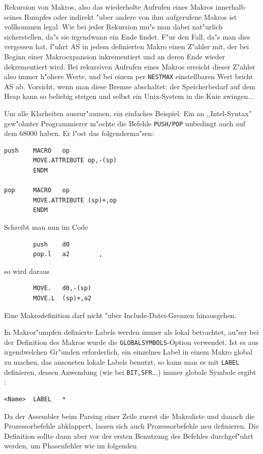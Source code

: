 \documentclass[12pt,a4paper,twoside]{report}
\newcommand{\tty}[1]{{\tt #1}}
\newcommand{\asname}{AS}
\begin{document}
Rekursion von Makros, also das wiederholte Aufrufen eines Makros innerhalb
seines Rumpfes oder indirekt "uber andere von ihm aufgerufene Makros ist
vollkommen legal.  Wie bei jeder Rekursion mu"s man dabei nat"urlich
sicherstellen, da"s sie irgendwann ein Ende findet.  F"ur den Fall, da"s
man dies vergessen hat, f"uhrt \asname{} in jedem definierten Makro einen Z"ahler
mit, der bei Beginn einer Makroexpansion inkrementiert und an deren Ende
wieder dekrementiert wird.  Bei rekursiven Aufrufen eines Makros erreicht
dieser Z"ahler also immer h"ohere Werte, und bei einem per {\tt NESTMAX}
einstellbaren Wert bricht \asname{} ab.  Vorsicht, wenn man diese Bremse
abschaltet: der Speicherbedarf auf dem Heap kann so beliebig steigen und
selbst ein Unix-System in die Knie zwingen...
\par
Um alle Klarheiten auszur"aumen, ein einfaches Beispiel:
Ein an ,,Intel-Syntax'' gew"ohnter Programmierer m"ochte die Befehle \tty{PUSH/POP}
unbedingt auch auf dem 68000 haben.  Er l"ost das
folgenderma"sen:
\begin{verbatim}
push    MACRO   op
        MOVE.ATTRIBUTE op,-(sp)
        ENDM

pop     MACRO   op
        MOVE.ATTRIBUTE (sp)+,op
        ENDM
\end{verbatim}
Schreibt man nun im Code
\begin{verbatim}
        push    d0
        pop.l   a2        ,
\end{verbatim}
so wird daraus
\begin{verbatim}
        MOVE.   d0,-(sp)
        MOVE.L  (sp)+,a2
\end{verbatim}
Eine Makrodefinition darf nicht "uber Include-Datei-Grenzen hinausgehen.
\par
In Makror"umpfen definierte Labels werden immer als lokal betrachtet,
au"ser bei der Definition des Makros wurde die
\tty{GLOBALSYMBOLS}-Option verwendet.  Ist es aus irgendwelchen Gr"unden
erforderlich, ein einzelnes Label in einem Makro global zu
machen, das ansonsten lokale Labels benutzt, so kann man es mit
\tty{LABEL} definieren, dessen Anwendung (wie bei \tty{BIT,SFR}...)
immer globale Symbole ergibt :
\begin{verbatim}
<Name>  LABEL   *
\end{verbatim}
Da der Assembler beim Parsing einer Zeile zuerst die Makroliste und
danach die Prozessorbefehle abklappert, lassen sich auch Prozessorbefehle
neu definieren.  Die Definition sollte dann aber vor der ersten Benutzung
des Befehles durchgef"uhrt werden, um Phasenfehler wie im folgenden
\end{document}
